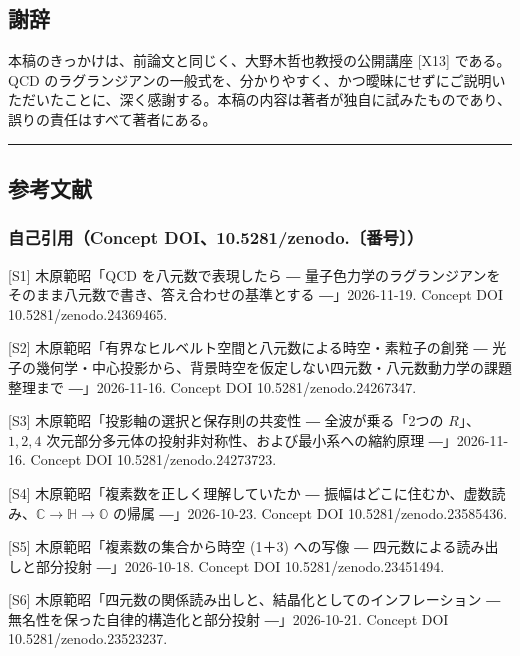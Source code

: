 \documentclass[
  a4paper,
]{ltjsarticle}
\begin{document}
\subsection{謝辞}\label{ux8b1dux8f9e}

本稿のきっかけは、前論文と同じく、大野木哲也教授の公開講座 {[}X13{]}
である。QCD
のラグランジアンの一般式を、分かりやすく、かつ曖昧にせずにご説明いただいたことに、深く感謝する。本稿の内容は著者が独自に試みたものであり、誤りの責任はすべて著者にある。

\begin{center}\rule{0.5\linewidth}{0.5pt}\end{center}

\subsection{参考文献}\label{ux53c2ux8003ux6587ux732e}

\subsubsection{自己引用（Concept
DOI、10.5281/zenodo.〔番号〕）}\label{ux81eaux5df1ux5f15ux7528concept-doi10.5281zenodo.ux756aux53f7}

{[}S1{]} 木原範昭「QCD を八元数で表現したら ―
量子色力学のラグランジアンをそのまま八元数で書き、答え合わせの基準とする
―」2026-11-19. Concept DOI 10.5281/zenodo.24369465.

{[}S2{]} 木原範昭「有界なヒルベルト空間と八元数による時空・素粒子の創発
―
光子の幾何学・中心投影から、背景時空を仮定しない四元数・八元数動力学の課題整理まで
―」2026-11-16. Concept DOI 10.5281/zenodo.24267347.

{[}S3{]} 木原範昭「投影軸の選択と保存則の共変性 ― 全波が乗る「2つの
\(R\)」、\(1, 2, 4\)
次元部分多元体の投射非対称性、および最小系への縮約原理 ―」2026-11-16.
Concept DOI 10.5281/zenodo.24273723.

{[}S4{]} 木原範昭「複素数を正しく理解していたか ―
振幅はどこに住むか、虚数読み、\(\mathbb{C} \to \mathbb{H} \to \mathbb{O}\)
の帰属 ―」2026-10-23. Concept DOI 10.5281/zenodo.23585436.

{[}S5{]} 木原範昭「複素数の集合から時空 (1＋3) への写像 ―
四元数による読み出しと部分投射 ―」2026-10-18. Concept DOI
10.5281/zenodo.23451494.

{[}S6{]}
木原範昭「四元数の関係読み出しと、結晶化としてのインフレーション ―
無名性を保った自律的構造化と部分投射 ―」2026-10-21. Concept DOI
10.5281/zenodo.23523237.
\end{document}
